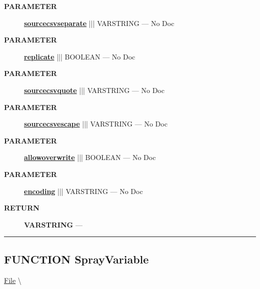 \begin{description}
\item [\colorbox{tagtype}{\color{white} \textbf{\textsf{PARAMETER}}}] \textbf{\underline{sourcecsvseparate}} ||| VARSTRING --- No Doc
\item [\colorbox{tagtype}{\color{white} \textbf{\textsf{PARAMETER}}}] \textbf{\underline{replicate}} ||| BOOLEAN --- No Doc
\item [\colorbox{tagtype}{\color{white} \textbf{\textsf{PARAMETER}}}] \textbf{\underline{sourcecsvquote}} ||| VARSTRING --- No Doc
\item [\colorbox{tagtype}{\color{white} \textbf{\textsf{PARAMETER}}}] \textbf{\underline{sourcecsvescape}} ||| VARSTRING --- No Doc
\item [\colorbox{tagtype}{\color{white} \textbf{\textsf{PARAMETER}}}] \textbf{\underline{allowoverwrite}} ||| BOOLEAN --- No Doc
\item [\colorbox{tagtype}{\color{white} \textbf{\textsf{PARAMETER}}}] \textbf{\underline{encoding}} ||| VARSTRING --- No Doc
\end{description}







\par
\begin{description}
\item [\colorbox{tagtype}{\color{white} \textbf{\textsf{RETURN}}}] \textbf{VARSTRING} --- 
\end{description}




\rule{\linewidth}{0.5pt}
\subsection*{\textsf{\colorbox{headtoc}{\color{white} FUNCTION}
SprayVariable}}

\hypertarget{ecldoc:file.sprayvariable}{}
\hspace{0pt} \hyperlink{ecldoc:File}{File} \textbackslash 

